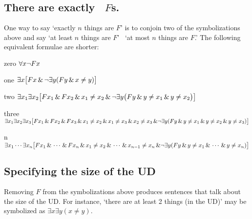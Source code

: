 \subsection*{There are exactly \blank\ $F$s.}
\label{summary.exactly}

One way to say `exactly $n$ things are $F$' is to conjoin two of the symbolizations above and say `at least $n$ things are $F$' \eand\ `at most $n$ things are $F$.' The following equivalent formulae are shorter:
\begin{ekey}
\item[zero] $\forall x\neg Fx$
\item[one] $\exists x\bigl[Fx \,\&\, \neg\exists y(Fy \,\&\, x\neq y)\bigr]$
\item[two] $\exists x_1\exists x_2\bigl[Fx_1 \,\&\, Fx_2 \,\&\, x_1 \neq x_2 \,\&\, \neg\exists y\bigl(Fy \,\&\, y\neq x_1 \,\&\, y \neq x_2\bigr) \bigr]$
\item[three] $\exists x_1\exists x_2\exists x_3\bigl[Fx_1 \,\&\, Fx_2 \,\&\, Fx_3 \,\&\, x_1 \neq x_2 \,\&\, x_1 \neq x_3 \,\&\, x_2 \neq x_3 \,\&\,\\
\neg\exists y(Fy \,\&\, y \neq x_1 \,\&\, y \neq x_2 \,\&\, y\neq x_3) \bigr]$
\item[n] $\exists x_1\cdots\exists x_n\bigl[Fx_1 \,\&\,\cdots\,\&\, Fx_n  \,\&\, x_1 \neq x_2 \,\&\,\cdots\,\&\, x_{n-1}\neq x_n \,\&\,\\
 \neg\exists y(Fy \,\&\, y\neq x_1 \,\&\, \cdots \,\&\, y\neq x_n)\bigr]$ 
\end{ekey}

\subsection*{Specifying the size of the UD}

Removing $F$ from the symbolizations above produces sentences that talk about the size of the UD. For instance, `there are at least 2 things (in the UD)' may be symbolized as $\exists x\exists y(x \neq y)$.






